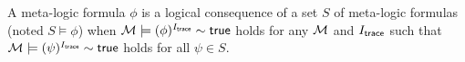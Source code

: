 \begin{definition}
  A meta-logic formula $\phi$ is a
  logical consequence of a set $S$ of meta-logic formulas
  (noted $S \models \phi$)
  when
  $\mathcal{M}\models(\phi)^{I_{\textsf{trace}}}\sim\mathsf{true}$ holds for any $\mathcal{M}$ and ${I_{\textsf{trace}}}$ such that
  $\mathcal{M}\models(\psi)^{I_{\textsf{trace}}}\sim\mathsf{true}$ holds for all $\psi\in S$.
\end{definition}
